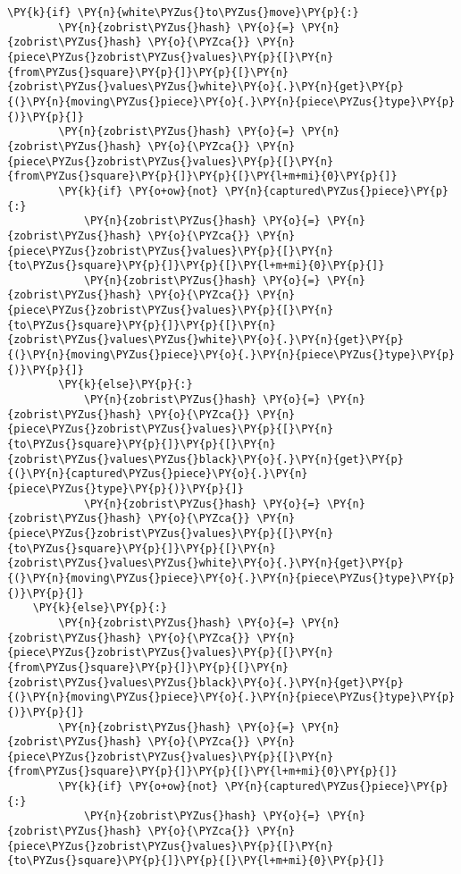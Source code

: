 \begin{tcolorbox}[fontupper=\linespread{.66}\selectfont, breakable, size=fbox, boxrule=1pt, pad at break*=1mm,colback=cellbackground, colframe=cellborder]
\begin{Verbatim}[commandchars=\\\{\}]
    \PY{k}{if} \PY{n}{white\PYZus{}to\PYZus{}move}\PY{p}{:}
        \PY{n}{zobrist\PYZus{}hash} \PY{o}{=} \PY{n}{zobrist\PYZus{}hash} \PY{o}{\PYZca{}} \PY{n}{piece\PYZus{}zobrist\PYZus{}values}\PY{p}{[}\PY{n}{from\PYZus{}square}\PY{p}{]}\PY{p}{[}\PY{n}{zobrist\PYZus{}values\PYZus{}white}\PY{o}{.}\PY{n}{get}\PY{p}{(}\PY{n}{moving\PYZus{}piece}\PY{o}{.}\PY{n}{piece\PYZus{}type}\PY{p}{)}\PY{p}{]}
        \PY{n}{zobrist\PYZus{}hash} \PY{o}{=} \PY{n}{zobrist\PYZus{}hash} \PY{o}{\PYZca{}} \PY{n}{piece\PYZus{}zobrist\PYZus{}values}\PY{p}{[}\PY{n}{from\PYZus{}square}\PY{p}{]}\PY{p}{[}\PY{l+m+mi}{0}\PY{p}{]}
        \PY{k}{if} \PY{o+ow}{not} \PY{n}{captured\PYZus{}piece}\PY{p}{:}
            \PY{n}{zobrist\PYZus{}hash} \PY{o}{=} \PY{n}{zobrist\PYZus{}hash} \PY{o}{\PYZca{}} \PY{n}{piece\PYZus{}zobrist\PYZus{}values}\PY{p}{[}\PY{n}{to\PYZus{}square}\PY{p}{]}\PY{p}{[}\PY{l+m+mi}{0}\PY{p}{]}
            \PY{n}{zobrist\PYZus{}hash} \PY{o}{=} \PY{n}{zobrist\PYZus{}hash} \PY{o}{\PYZca{}} \PY{n}{piece\PYZus{}zobrist\PYZus{}values}\PY{p}{[}\PY{n}{to\PYZus{}square}\PY{p}{]}\PY{p}{[}\PY{n}{zobrist\PYZus{}values\PYZus{}white}\PY{o}{.}\PY{n}{get}\PY{p}{(}\PY{n}{moving\PYZus{}piece}\PY{o}{.}\PY{n}{piece\PYZus{}type}\PY{p}{)}\PY{p}{]}
        \PY{k}{else}\PY{p}{:}
            \PY{n}{zobrist\PYZus{}hash} \PY{o}{=} \PY{n}{zobrist\PYZus{}hash} \PY{o}{\PYZca{}} \PY{n}{piece\PYZus{}zobrist\PYZus{}values}\PY{p}{[}\PY{n}{to\PYZus{}square}\PY{p}{]}\PY{p}{[}\PY{n}{zobrist\PYZus{}values\PYZus{}black}\PY{o}{.}\PY{n}{get}\PY{p}{(}\PY{n}{captured\PYZus{}piece}\PY{o}{.}\PY{n}{piece\PYZus{}type}\PY{p}{)}\PY{p}{]}
            \PY{n}{zobrist\PYZus{}hash} \PY{o}{=} \PY{n}{zobrist\PYZus{}hash} \PY{o}{\PYZca{}} \PY{n}{piece\PYZus{}zobrist\PYZus{}values}\PY{p}{[}\PY{n}{to\PYZus{}square}\PY{p}{]}\PY{p}{[}\PY{n}{zobrist\PYZus{}values\PYZus{}white}\PY{o}{.}\PY{n}{get}\PY{p}{(}\PY{n}{moving\PYZus{}piece}\PY{o}{.}\PY{n}{piece\PYZus{}type}\PY{p}{)}\PY{p}{]}
    \PY{k}{else}\PY{p}{:}
        \PY{n}{zobrist\PYZus{}hash} \PY{o}{=} \PY{n}{zobrist\PYZus{}hash} \PY{o}{\PYZca{}} \PY{n}{piece\PYZus{}zobrist\PYZus{}values}\PY{p}{[}\PY{n}{from\PYZus{}square}\PY{p}{]}\PY{p}{[}\PY{n}{zobrist\PYZus{}values\PYZus{}black}\PY{o}{.}\PY{n}{get}\PY{p}{(}\PY{n}{moving\PYZus{}piece}\PY{o}{.}\PY{n}{piece\PYZus{}type}\PY{p}{)}\PY{p}{]}
        \PY{n}{zobrist\PYZus{}hash} \PY{o}{=} \PY{n}{zobrist\PYZus{}hash} \PY{o}{\PYZca{}} \PY{n}{piece\PYZus{}zobrist\PYZus{}values}\PY{p}{[}\PY{n}{from\PYZus{}square}\PY{p}{]}\PY{p}{[}\PY{l+m+mi}{0}\PY{p}{]}
        \PY{k}{if} \PY{o+ow}{not} \PY{n}{captured\PYZus{}piece}\PY{p}{:}
            \PY{n}{zobrist\PYZus{}hash} \PY{o}{=} \PY{n}{zobrist\PYZus{}hash} \PY{o}{\PYZca{}} \PY{n}{piece\PYZus{}zobrist\PYZus{}values}\PY{p}{[}\PY{n}{to\PYZus{}square}\PY{p}{]}\PY{p}{[}\PY{l+m+mi}{0}\PY{p}{]}

\end{Verbatim}
\end{tcolorbox}
